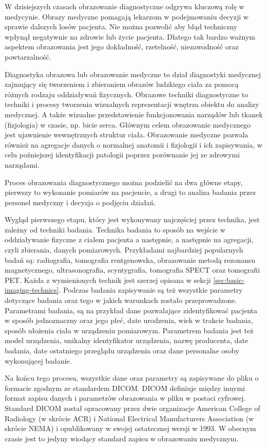 W dzisiejszych czasach obrazowanie diagnostyczne odgrywa kluczową rolę w medycynie.
Obrazy medyczne pomagają lekarzom w podejmowaniu decyzji w sprawie dalszych losów pacjenta.
Nie można pozwolić aby błąd techniczny wpłynął negatywnie na zdrowie lub życie pacjenta.
Dlatego tak bardzo ważnym aspektem obrazowania jest jego dokładność, rzetelność, niezawodność oraz powtarzalność.

Diagnostyka obrazowa lub obrazowanie medyczne to dział diagnostyki medycznej zajmujący się tworzeniem i zbieraniem obrazów ludzkiego ciała za pomocą różnych rodzaju oddziaływań fizycznych.
Obrazowe techniki diagnostyczne to techniki i procesy tworzenia wizualnych reprezentacji wnętrza obiektu do analizy medycznej.
A także wizualne przedstawienie funkcjonowania narządów lub tkanek (fizjologia) w czasie, np. bicie serca.
Głównym celem obrazowanie medycznego jest ujawnienie wewnętrznych struktur ciała.
Obrazowanie medyczne pozwala również na agregacje danych o normalnej anatomii i fizjologii i ich zapisywania, w celu poźniejszej identyfikacji patologii poprzez porównanie jej ze zdrowymi narządami.

Proces obrazowania diagnostycznego można podzielić na dwa główne etapy, pierwszy to wykonanie pomiarów na pacjencie, a drugi to analiza badania przez personel medyczny i decyzja o podjęciu działań.

Wygląd pierwszego etapu, który jest wykonywany najczęściej przez technika, jest zależny od techniki badania.
Technika badania to sposób na wejście w oddziaływanie fizyczne z ciałem pacjenta a następnie, a następnie na agregacji, czyli zbierania, danych pomiarowych.
Przykładami najbardziej popularnych badań są: radiografia, tomografia rentgenowska, obrazowanie metodą rezonansu magnetycznego, ultrasonografia, scyntygrafia, tomografia SPECT oraz tomografii PET.
Każda z wymienionych technik jest szerzej opisana w sekcji \ref{sec:basic-imaging-technics}.
Podczas badania zapisywanie są też wszystkie parametry dotyczące badania oraz tego w jakich warunkach zostało przeprowadzone.
Parametrami badania, są na przykład dane pozwalające zidentyfikować pacjenta w sposób jednoznaczny oraz jego płeć, date urodzenia, wiek w trakcie badania, sposób ułożenia ciała w urządzeniu pomiarowym.
Parametrem badania jest też model urządzenia, unikalny identyfikator urządzenia, nazwę producenta, date badania, date ostatniego przeglądu urządzenia oraz dane personalne osoby wykonującej badanie.

Na końcu tego procesu, wszystkie dane oraz parametry są zapisywane do pliku o formacie zgodnym ze standardem DICOM.
DICOM definiuje między innymi format zapisu danych i parametrów obrazowania w pliku w postaci cyfrowej.
Standard DICOM został opracowany przez dwie organizacje American College of Radiology (w skrócie ACR) i National Electrical Manufacturers Association (w skrócie NEMA) i opublikowany w swojej ostatecznej wersji w 1993.
W obecnym czasie jest to jedyny wiodący standard zapisu w obrazowaniu medycznym.

